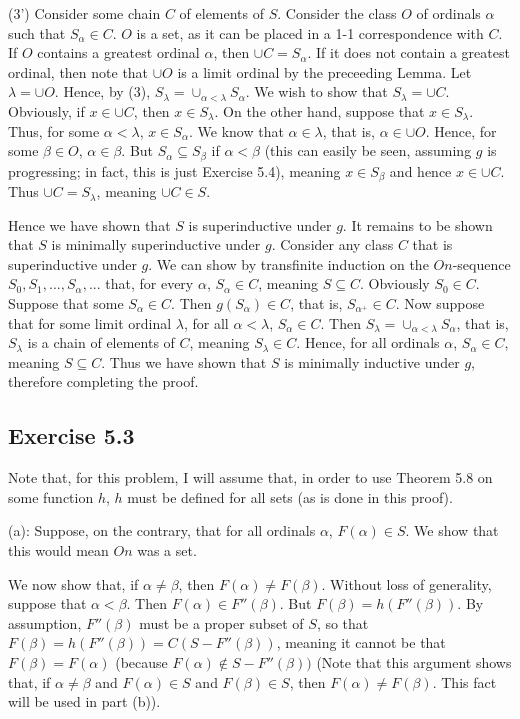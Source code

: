 \documentclass{article}
\theoremstyle{definition}
\begin{document}
(3') Consider some chain $C$ of elements of $S$. Consider the class $O$ of ordinals $\alpha$ such that 
$S_\alpha\in C$. $O$ is a set, as it can be placed in a 1-1 correspondence with $C$. If $O$ contains a greatest 
ordinal $\alpha$, then $\cup C=S_\alpha$. If it does not contain a greatest ordinal, then note that $\cup O$ is a limit ordinal by the preceeding Lemma. 
Let $\lambda=\cup O$. Hence, by (3), $S_\lambda=\cup_{\alpha<\lambda}S_\alpha$. We wish to show that $S_\lambda=\cup C$. Obviously, if 
$x\in\cup C$, then $x\in S_\lambda$. On the other hand, suppose that $x\in S_\lambda$. Thus, for some $\alpha<\lambda$, $x\in S_\alpha$. We know that 
$\alpha\in\lambda$, that is, $\alpha\in\cup O$. Hence, for some $\beta\in O$, $\alpha\in\beta$. But $S_\alpha\subseteq S_\beta$ if $\alpha<\beta$ (this can easily be 
seen, assuming $g$ is progressing; in fact, this is just Exercise 5.4), meaning $x\in S_\beta$ and hence $x\in\cup C$. Thus $\cup C=S_\lambda$, meaning $\cup C\in S$.

Hence we have shown that $S$ is superinductive under $g$. It remains to be shown that $S$ is minimally superinductive under $g$. Consider any class $C$ that 
is superinductive under $g$. We can show by transfinite induction on the $On$-sequence $S_0,S_1,...,S_\alpha,...$ that, for every $\alpha$, $S_\alpha\in C$, meaning 
$S\subseteq C$. Obviously $S_0\in C$. Suppose that some $S_\alpha\in C$. Then $g(S_\alpha)\in C$, that is, $S_{\alpha^+}\in C$. Now suppose that for some limit ordinal 
$\lambda$, for all $\alpha<\lambda$, $S_\alpha\in C$. Then $S_\lambda=\cup_{\alpha<\lambda}S_\alpha$, that is, $S_\lambda$ is a chain of elements of $C$, meaning 
$S_\lambda\in C$. Hence, for all ordinals $\alpha$, $S_\alpha\in C$, meaning $S\subseteq C$. Thus we have shown that $S$ is minimally inductive under $g$, therefore completing the 
proof.

\subsection*{Exercise 5.3}
Note that, for this problem, I will assume that, in order to use Theorem 5.8 on some function $h$, $h$ must be defined for all sets (as is done in this proof).

(a): Suppose, on the contrary, that for all ordinals $\alpha$, $F(\alpha)\in S$. We show that this would mean $On$ was a set. 

We now show that, if $\alpha\ne\beta$, then $F(\alpha)\ne F(\beta)$. Without loss of generality, suppose that $\alpha<\beta$. Then 
$F(\alpha)\in F''(\beta)$. But $F(\beta)=h(F''(\beta))$. By assumption, $F''(\beta)$ must be a proper subset of $S$, so that 
$F(\beta)=h(F''(\beta))=C(S-F''(\beta))$, meaning it cannot be that $F(\beta)=F(\alpha)$ (because $F(\alpha)\notin S-F''(\beta))$ (Note that this argument shows that, 
if $\alpha\ne\beta$ and $F(\alpha)\in S$ and $F(\beta)\in S$, then $F(\alpha)\ne F(\beta)$. This fact will be used in part (b)). 
\end{document}
